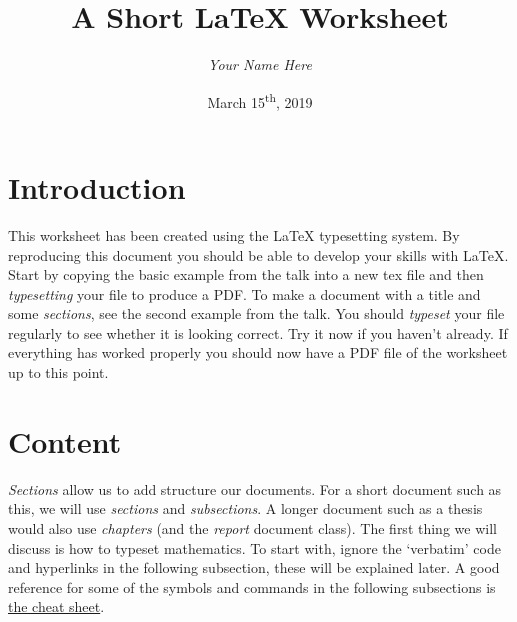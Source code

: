 \documentclass{article}
\author{\emph{Your Name Here}}
\title{A Short \LaTeX{} Worksheet}
\date{March 15\textsuperscript{th}, 2019}
\begin{document}
\maketitle
\section{Introduction}
\label{sec:introduction}
This worksheet has been created using the \LaTeX{} typesetting system. By reproducing this document you should be able to develop your skills with \LaTeX{}. Start by copying the basic example from the talk into a new tex file and then \emph{typesetting} your file to produce a PDF. To make a document with a title and some \emph{sections}, see the second example from the talk. You should \emph{typeset} your file regularly to see whether it is looking correct. Try it now if you haven't already. If everything has worked properly you should now have a PDF file of the worksheet up to this point. 

\section{Content}
\label{sec:content}

\emph{Sections} allow us to add structure our documents. For a short document such as this, we will use \emph{sections} and \emph{subsections}. A longer document such as a thesis would also use \emph{chapters} (and the \emph{report} document class). The first thing we will discuss is how to typeset mathematics. To start with, ignore the `verbatim' code and hyperlinks in the following subsection, these will be explained later. A good reference for some of the symbols and commands in the following subsections is \href{https://wch.github.io/latexsheet/latexsheet.pdf}{the \LaTeXe{} cheat sheet}.
\end{document}
